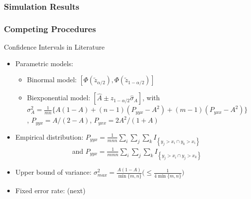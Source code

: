 \documentclass{beamer}
\begin{document}

\begin{frame}
\frametitle{Simulation Results}





\end{frame}



\begin{frame}
\frametitle{Competing Procedures}

Confidence Intervals in Literature
\begin{itemize}

    \item Parametric models:
    \begin{itemize}
        \item Binormal model: $[\Phi(\tilde{z}_{\alpha/2}), \Phi(\tilde{z}_{1-\alpha/2})]$
        \item Biexponential model: $[\hat{A} \pm  z_{1-\alpha/2} \hat{\sigma}_A]$, with \\
        $\sigma^2_A = \frac{1}{mn} \{ A(1 - A) + (n - 1)(P_{yyx} - A^2) + (m - 1)(P_{yxx} - A^2) \}$,
        $P_{yyx} = A/(2-A)$, $P_{yxx} = 2A^2/(1+A)$
    \end{itemize}

    \item Empirical distribution: $P_{yyx} = \frac{1}{mnn} \sum_i \sum_j \sum_k I_{\left\{ y_j > x_i \cap y_k > x_i \right\}}$ \\
    $\qquad\qquad\qquad\qquad$ and $P_{yyx} = \frac{1}{mmn} \sum_i \sum_j \sum_k I_{\left\{ y_j > x_i \cap y_j > x_k \right\}}$

    \item Upper bound of variance: $\sigma^2_{max} = \frac{A(1-A)}{\min\{ m, n \}} \big( \leq \frac{1}{4 \min\{ m, n \} } \big) $

    \item Fixed error rate: (next)

\end{itemize}

\end{frame}

\end{document}
